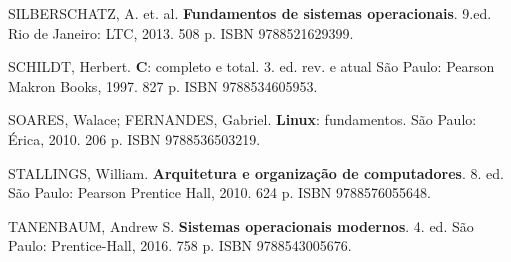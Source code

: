\begin{pud}
\begin{bibbasica}
	\end{bibbasica}
	
	\begin{bibcomplementar}
	
		\item SILBERSCHATZ, A. et. al. \textbf{Fundamentos de sistemas operacionais}. 9.ed. Rio de Janeiro: LTC, 2013. 508 p. ISBN 9788521629399.
		\item SCHILDT, Herbert. \textbf{C}: completo e total. 3. ed. rev. e atual São Paulo: Pearson
		Makron Books, 1997. 827 p. ISBN 9788534605953.
		\item SOARES, Walace; FERNANDES, Gabriel. \textbf{Linux}: fundamentos. São Paulo: Érica,
		2010. 206 p. ISBN 9788536503219.
		\item STALLINGS, William. \textbf{Arquitetura e organização de computadores}. 8. ed. São
		Paulo: Pearson Prentice Hall, 2010. 624 p. ISBN 9788576055648.
		\item TANENBAUM, Andrew S. \textbf{Sistemas operacionais modernos}. 4. ed. São Paulo:
		Prentice-Hall, 2016. 758 p. ISBN 9788543005676.
		
	\end{bibcomplementar}
	
	
\end{pud}


